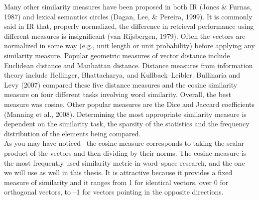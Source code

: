 Many other similarity measures have been proposed in both IR (Jones \& Furnas, 1987)\cite{jones_pictures_1987} and lexical 
semantics circles (Dagan, Lee, \& Pereira, 1999)\cite{journals/ml/DaganLP99}. It is commonly said in IR that, properly 
normalized, the difference in retrieval performance using different measures is insignificant (van 
Rijsbergen, 1979)\cite{vanrijsbergen1979}. Often the vectors are normalized in some way (e.g., unit length or unit probability) 
before applying any similarity measure. Popular geometric measures of vector distance include 
Euclidean distance and Manhattan distance. Distance measures from information theory include 
Hellinger, Bhattacharya, and Kullback--Leibler. Bullinaria and Levy (2007)\cite{bullinaria2007} compared these five distance 
measures and the cosine similarity measure on four different tasks involving word similarity. Overall, the 
best measure was cosine. Other popular measures are the Dice and Jaccard coefficients (Manning et 
al., 2008)\cite{manning-etal:08}. Determining the most appropriate similarity measure is dependent on the similarity task, the 
sparsity of the statistics and the frequency distribution of the elements being compared. 
\\As you may have noticed-- the cosine measure corresponds to taking the scalar product of the vectors and then dividing by their norms. The cosine measure is the most frequently used similarity metric in word--space research, and the one we will use as well in this thesis. It is attractive because it provides a fixed measure of similarity and it ranges from 1 for identical vectors, over 0 for orthogonal vectors, to --1 for vectors pointing in the opposite directions.